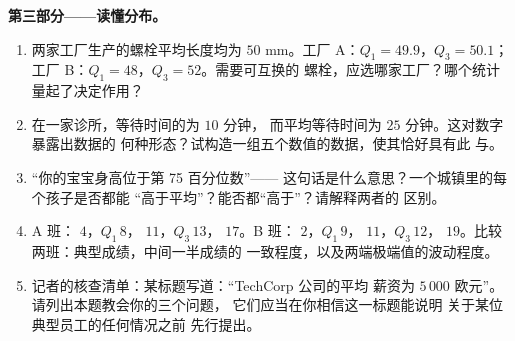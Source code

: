 \begin{problem}
\medskip
\noindent\textbf{第三部分——读懂分布。}
\begin{enumerate}[resume]
  \item 两家工厂生产的螺栓平均长度均为
        $50$ mm。工厂 A：$Q_1 = 49.9$，$Q_3 = 50.1$；工厂
        B：$Q_1 = 48$，$Q_3 = 52$。需要可互换的
        螺栓，应选哪家工厂？哪个统计量起了决定作用？
  \item 在一家诊所，等待时间的为 $10$ 分钟，
        而平均等待时间为 $25$ 分钟。这对数字暴露出数据的
        何种形态？试构造一组五个数值的数据，使其恰好具有此
        与。
  \item “你的宝宝身高位于第 75 百分位数”——
        这句话是什么意思？一个城镇里的每个孩子是否都能
        “高于平均”？能否都“高于”？请解释两者的
        区别。
  \item A 班： $4$，$Q_1\,8$， $11$，$Q_3\,13$，
        $17$。B 班： $2$，$Q_1\,9$， $11$，$Q_3\,12$，
        $19$。比较两班：典型成绩，中间一半成绩的
        一致程度，以及两端极端值的波动程度。
  \item 记者的核查清单：某标题写道：“TechCorp 公司的平均
        薪资为 $5\,000$ 欧元”。请列出本题教会你的三个问题，
        它们应当在你相信这一标题能说明
        关于某位典型员工的任何情况之前
        先行提出。
\end{enumerate}


\end{problem}
